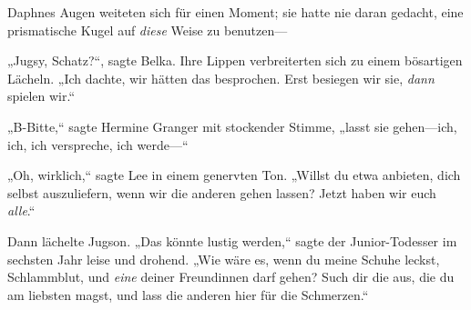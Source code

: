 Daphnes Augen weiteten sich für einen Moment; sie hatte nie daran gedacht, eine prismatische Kugel auf \emph{diese} Weise zu benutzen—

„Jugsy, Schatz?“, sagte Belka. Ihre Lippen verbreiterten sich zu einem bösartigen Lächeln. „Ich dachte, wir hätten das besprochen. Erst besiegen wir sie, \emph{dann} spielen wir.“

„B-Bitte,“ sagte Hermine Granger mit stockender Stimme, „lasst sie gehen—ich, ich, ich verspreche, ich werde—“

„Oh, wirklich,“ sagte Lee in einem genervten Ton. „Willst du etwa anbieten, dich selbst auszuliefern, wenn wir die anderen gehen lassen? Jetzt haben wir euch \emph{alle}.“

Dann lächelte Jugson. „Das könnte lustig werden,“ sagte der Junior-Todesser im sechsten Jahr leise und drohend. „Wie wäre es, wenn du meine Schuhe leckst, Schlammblut, und \emph{eine} deiner Freundinnen darf gehen? Such dir die aus, die du am liebsten magst, und lass die anderen hier für die Schmerzen.“

